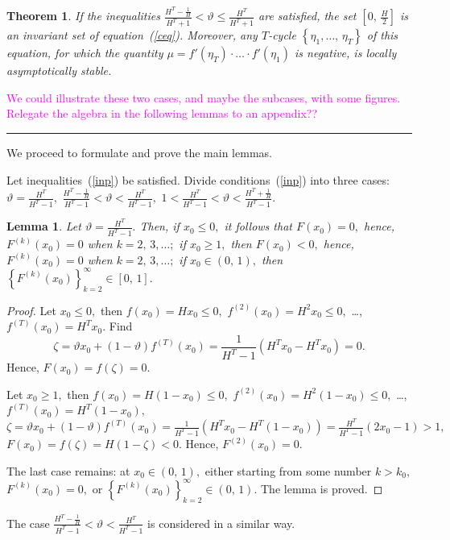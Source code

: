 \documentclass[12pt,a4paper]{amsart}
\newtheorem{theorem}{Theorem}
\newtheorem{lemma}{Lemma}
\begin{document}
\begin{theorem}\label{t3}
If the inequalities $\frac{H^T-\frac{1}{H}}{H^T+1}<\vartheta\leq\frac{H^T}{H^T+1}$ are satisfied, the set $\left[0,\,\frac{H}{2}\right]$ is an invariant set
of equation~(\ref{ceq}). Moreover, any $T$-cycle $\left\{\eta_1,\ldots,\,\eta_T\right\}$ of this equation, for which the quantity 
$\mu = f'(\eta_T)\cdot\ldots\cdot f'(\eta_1)$ is negative, is locally asymptotically stable.
\end{theorem}
\vskip 12pt
\textcolor{magenta}{
We could illustrate these two cases, and maybe the subcases, with some figures.  Relegate the algebra in the following lemmas to an appendix??}
\vskip 10pt
\textcolor{magenta}{\hrule}
\vskip 10pt

We proceed to formulate and prove the main lemmas.

Let inequalities~(\ref{inp}) be satisfied. Divide conditions~(\ref{inp}) into three cases: $\vartheta=\frac{H^T}{H^T-1},$
$\frac{H^T-\frac{1}{H}}{H^T-1}<\vartheta<\frac{H^T}{H^T-1},$ $1<\frac{H^T}{H^T-1}<\vartheta<\frac{H^T+\frac{1}{H}}{H^T-1}.$

\begin{lemma}\label{l2}
Let $\vartheta=\frac{H^T}{H^T-1}.$ Then, if $x_0\leq 0,$ it follows that $F(x_0)=0,$ hence, $F^{(k)}(x_0)=0$ when $k=2,\,3,\ldots;$
if $x_0\geq 1,$ then $F(x_0)<0,$ hence, $F^{(k)}(x_0)=0$ when $k=2,\,3,\ldots;$ if $x_0\in(0,\,1),$ then 
$\left\{F^{(k)}(x_0)\right\}_{k=2}^{\infty}\in[0,\,1].$  
\end{lemma}

\begin{proof}
Let $x_0\leq 0,$ then $f(x_0)=Hx_0\leq 0,$ $f^{(2)}(x_0)=H^2 x_0\leq 0,$ \ldots, $f^{(T)}(x_0)=H^T x_0.$  Find 
$$
\zeta=\vartheta x_0 + (1-\vartheta)f^{(T)}(x_0)=\frac{1}{H^T-1}\left(H^T x_0 - H^T x_0\right)=0.
$$ 
Hence, $F(x_0)=f(\zeta)=0.$

Let $x_0\geq 1,$ then $f(x_0)=H (1-x_0)\leq 0,$ $f^{(2)}(x_0)=H^2 (1-x_0)\leq 0,$ \ldots, $f^{(T)}(x_0)=H^T (1-x_0),$
$\zeta=\vartheta x_0 + (1-\vartheta)f^{(T)}(x_0)=\frac{1}{H^T-1}\left(H^T x_0 - H^T (1-x_0)\right)=\frac{H^T}{H^T-1}(2x_0-1)>1,$
$F(x_0)=f(\zeta)=H(1-\zeta)<0.$ Hence, $F^{(2)}(x_0)=0.$ 

The last case remains: at $x_0\in(0,\,1),$ either starting from some number $k>k_0,$  $F^{(k)}(x_0)=0,$ or 
$\left\{F^{(k)}(x_0)\right\}_{k=2}^{\infty}\in(0,\,1).$ The lemma is proved.
\end{proof}

The case $\frac{H^T-\frac{1}{H}}{H^T-1}<\vartheta<\frac{H^T}{H^T-1}$ is considered in a similar way.
\end{document}
